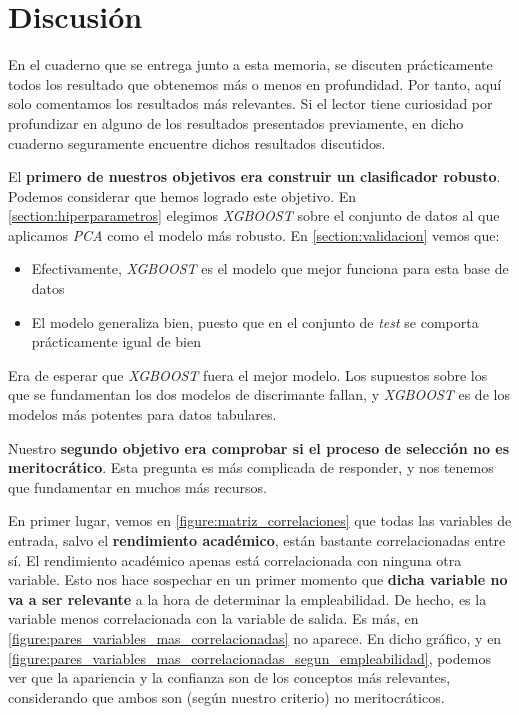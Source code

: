 \section{Discusión} \label{section:Discusion}

En el cuaderno que se entrega junto a esta memoria, se discuten prácticamente todos los resultado que obtenemos más o menos en profundidad. Por tanto, aquí solo comentamos los resultados más relevantes. Si el lector tiene curiosidad por profundizar en alguno de los resultados presentados previamente, en dicho cuaderno seguramente encuentre dichos resultados discutidos.

El \textbf{primero de nuestros objetivos era construir un clasificador robusto}. Podemos considerar que hemos logrado este objetivo. En \ref{section:hiperparametros} elegimos \textit{XGBOOST} sobre el conjunto de datos al que aplicamos \textit{PCA} como el modelo más robusto. En \ref{section:validacion} vemos que:

\begin{itemize}
    \item Efectivamente, \textit{XGBOOST} es el modelo que mejor funciona para esta base de datos
    \item El modelo generaliza bien, puesto que en el conjunto de \textit{test} se comporta prácticamente igual de bien
\end{itemize}

Era de esperar que \textit{XGBOOST} fuera el mejor modelo. Los supuestos sobre los que se fundamentan los dos modelos de discrimante fallan, y \textit{XGBOOST} es de los modelos más potentes para datos tabulares.

Nuestro \textbf{segundo objetivo era comprobar si el proceso de selección no es meritocrático}. Esta pregunta es más complicada de responder, y nos tenemos que fundamentar en muchos más recursos.

En primer lugar, vemos en \ref{figure:matriz_correlaciones} que todas las variables de entrada, salvo el \textbf{rendimiento académico}, están bastante correlacionadas entre sí. El rendimiento académico apenas está correlacionada con ninguna otra variable. Esto nos hace sospechar en un primer momento que \textbf{dicha variable no va a ser relevante} a la hora de determinar la empleabilidad. De hecho, es la variable menos correlacionada con la variable de salida. Es más, en \ref{figure:pares_variables_mas_correlacionadas} no aparece. En dicho gráfico, y en \ref{figure:pares_variables_mas_correlacionadas_segun_empleabilidad}, podemos ver que la apariencia y la confianza son de los conceptos más relevantes, considerando que ambos son (según nuestro criterio) no meritocráticos.

